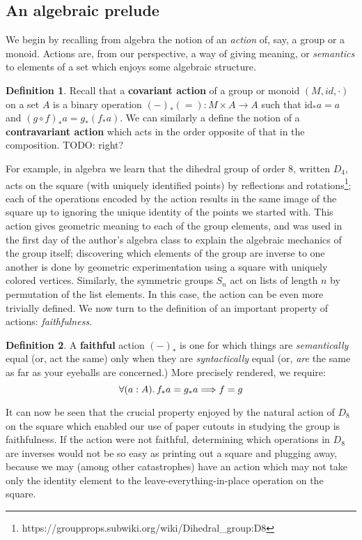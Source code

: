 \documentclass[12pt,twoside]{reedthesis}
\theoremstyle{definition}
\newtheorem{definition}{Definition}
\theoremstyle{remark}
\theoremstyle{plain}
\begin{document}
\subsection{An algebraic prelude}
We begin by recalling from algebra the notion of an \emph{action} of, say, a
group or a monoid. Actions are, from our perspective, a way of giving meaning,
or \emph{semantics} to elements of a set which enjoys some algebraic structure.
\begin{definition}\label{def:covariant action}
  Recall that a \textbf{covariant action} of a group or monoid \((M, id, \cdot)\) on a
  set \(A\) is a binary operation \((-)_* (=) : M ‌\times A \rightarrow A\) such that
  \(\text{id}_* a = a\) and \( (g \circ f)_* a = g_* (f_* a) \). We can similarly a
  define the notion of a \textbf{contravariant action} which acts in the order
  opposite of that in the composition. TODO: right?
\end{definition}

For example, in algebra we learn that the dihedral group of order 8, written
$D_{4}$, acts on the square (with uniquely identified points) by reflections and
rotations\footnote{https://groupprops.subwiki.org/wiki/Dihedral\_group:D8}; each
of the operations encoded by the action results in the same image of the square
up to ignoring the unique identity of the points we started with. This action
gives geometric meaning to each of the group elements, and was used in the first
day of the author's algebra class to explain the algebraic mechanics of the
group itself; discovering which elements of the group are inverse to one another
is done by geometric experimentation using a square with uniquely colored
vertices. Similarly, the symmetric groups $S_{n}$ act on lists of length $n$ by
permutation of the list elements. In this case, the action can be even more
trivially defined. We now turn to the definition of an important property of
actions: \emph{faithfulness}.

\begin{definition}\label{def:faithful}
  A \textbf{faithful} action $(-)_{*}$ is one for which things are
  \emph{semantically} equal (or, act the same) only when they are
  \emph{syntactically} equal (or, \emph{are} the same as far as your eyeballs
  are concerned.) More precisely rendered, we
  require: \[ \forall (a:A)\ldotp f_* a = g_* a \Longrightarrow f = g \]
\end{definition}

It can now be seen that the crucial property enjoyed by the natural action of
$D_{8}$ on the square which enabled our use of paper cutouts in studying the
group is faithfulness. If the action were not faithful, determining which
operations in $D_{8}$ are inverses would not be so easy as printing out a square
and plugging away, because we may (among other catastrophes) have an action
which may not take only the identity element to the leave-everything-in-place
operation on the square.
\end{document}
